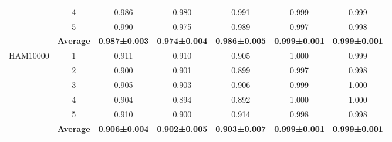 \documentclass[review]{elsarticle}
\begin{document}
\begin{table*}[]
{\begin{tabular}{|c|c|c|c|c|c|c|}
                          & 4                & 0.986                & 0.980                & 0.991                & 0.999                & 0.999                \\ \cline{2-7} 
                          & 5                & 0.990                & 0.975                & 0.989                & 0.997                & 0.998                \\ \cline{2-7} 
                          & \textbf{Average} & \textbf{0.987±0.003} & \textbf{0.974±0.004} & \textbf{0.986±0.005} & \textbf{0.999±0.001} & \textbf{0.999±0.001} \\ \hline
\multirow{6}{*}{HAM10000} & 1                & 0.911                & 0.910                & 0.905                & 1.000                & 0.999                \\ \cline{2-7} 
                          & 2                & 0.900                & 0.901                & 0.899                & 0.997                & 0.998                \\ \cline{2-7} 
                          & 3                & 0.905                & 0.903                & 0.906                & 0.999                & 1.000                \\ \cline{2-7} 
                          & 4                & 0.904                & 0.894                & 0.892                & 1.000                & 1.000                \\ \cline{2-7} 
                          & 5                & 0.910                & 0.900                & 0.914                & 0.998                & 0.998                \\ \cline{2-7} 
                          & \textbf{Average} & \textbf{0.906±0.004} & \textbf{0.902±0.005} & \textbf{0.903±0.007} & \textbf{0.999±0.001} & \textbf{0.999±0.001} \\ \hline
\end{tabular}
}
\end{table*}
\end{document}
